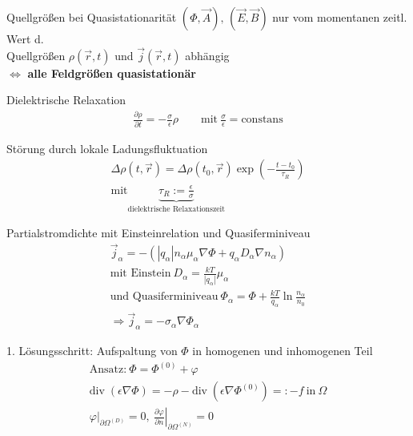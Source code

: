 \documentclass[a6paper]{kartei}
\renewcommand{\div}{\mathrm{div}\;}
\begin{document}
\begin{karte}{Quellgrößen bei Quasistationarität}
$(\Phi, \vec{A}), \, (\vec{E}, \vec{B})$ nur vom momentanen zeitl. Wert d. \\ Quellgrößen $\rho(\vec{r},t)$ und $\vec{j}(\vec{r},t)$ abhängig \\
$\Leftrightarrow$ \textbf{alle Feldgrößen quasistationär}
\end{karte}

\begin{karte}{Dielektrische Relaxation}
\begin{eqnarray}
 \frac{\partial \rho}{\partial t} = - \frac{\sigma}{\epsilon} \rho \qquad \text{mit} \ \frac{\sigma}{\epsilon} = \text{constans}
\end{eqnarray}
\end{karte}

\begin{karte}{Störung durch lokale Ladungsfluktuation}
\begin{eqnarray}
 \Delta\rho(t,\vec{r}) =  \Delta\rho(t_{0},\vec{r}) \operatorname{exp}\left(-\frac{t-t_{0}}{\tau_{R}} \right) \\
 \text{mit} \underbrace{\tau_{R} := \frac{\epsilon}{\sigma}}_{\text{dielektrische Relaxationszeit}}
\end{eqnarray}
\end{karte}

\begin{karte}{Partialstromdichte mit Einsteinrelation und Quasiferminiveau}
\begin{eqnarray}
 \vec{j}_{\alpha} = -(|q_{\alpha}| n_{\alpha} \mu_{\alpha} \nabla \Phi + q_{\alpha} D_{\alpha} \nabla n_{\alpha}) \\
 \text{mit Einstein} \ D_{\alpha} = \frac{kT}{|q_{\alpha}|} \mu_{\alpha}  \\
 \text{und Quasiferminiveau} \ \Phi_{\alpha} = \Phi + \frac{kT}{q_{\alpha}} \operatorname{ln} \frac{n_{\alpha}}{n_{0}} \\
 \Rightarrow \vec{j}_{\alpha} = - \sigma_{\alpha} \nabla \Phi_{\alpha}
\end{eqnarray}
\end{karte}
\begin{karte}{1. Lösungsschritt: Aufspaltung von $\Phi$ in homogenen und inhomogenen Teil}
\begin{eqnarray}
  \text{Ansatz:} \ \Phi = \Phi^{(0)} + \varphi \nonumber \\
 \div(\epsilon \nabla \Phi) = - \rho - \div(\epsilon \nabla \Phi^{(0)}) =: -f \ \text{in} \ \Omega \nonumber \\
 \varphi|_{\partial \Omega^{(D)}} = 0, \ \left. \frac{\partial \varphi}{\partial n} \right|_{\partial \Omega^{(N)}} = 0
\end{eqnarray}
\end{karte}
\end{document}
